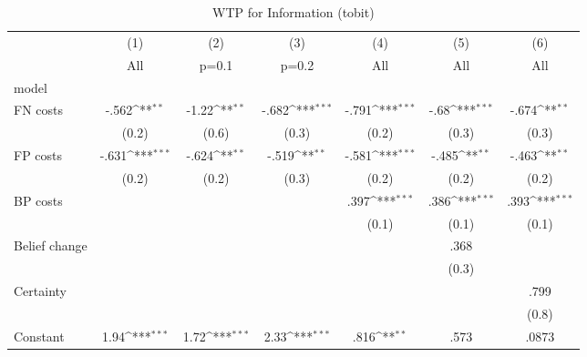 \begin{table}[htbp]\centering
\def\sym#1{\ifmmode^{#1}\else\(^{#1}\)\fi}
\caption{WTP for Information (tobit)}
\begin{tabular}{l*{6}{c}}
\hline\hline
                &\multicolumn{1}{c}{(1)}&\multicolumn{1}{c}{(2)}&\multicolumn{1}{c}{(3)}&\multicolumn{1}{c}{(4)}&\multicolumn{1}{c}{(5)}&\multicolumn{1}{c}{(6)}\\
                &\multicolumn{1}{c}{All}&\multicolumn{1}{c}{p=0.1}&\multicolumn{1}{c}{p=0.2}&\multicolumn{1}{c}{All}&\multicolumn{1}{c}{All}&\multicolumn{1}{c}{All}\\
\hline
model           &                  &                  &                  &                  &                  &                  \\
FN costs        &    -.562\sym{**} &    -1.22\sym{**} &    -.682\sym{***}&    -.791\sym{***}&     -.68\sym{***}&    -.674\sym{**} \\
                &    (0.2)         &    (0.6)         &    (0.3)         &    (0.2)         &    (0.3)         &    (0.3)         \\
FP costs        &    -.631\sym{***}&    -.624\sym{**} &    -.519\sym{**} &    -.581\sym{***}&    -.485\sym{**} &    -.463\sym{**} \\
                &    (0.2)         &    (0.2)         &    (0.3)         &    (0.2)         &    (0.2)         &    (0.2)         \\
BP costs        &                  &                  &                  &     .397\sym{***}&     .386\sym{***}&     .393\sym{***}\\
                &                  &                  &                  &    (0.1)         &    (0.1)         &    (0.1)         \\
Belief change   &                  &                  &                  &                  &     .368         &                  \\
                &                  &                  &                  &                  &    (0.3)         &                  \\
Certainty       &                  &                  &                  &                  &                  &     .799         \\
                &                  &                  &                  &                  &                  &    (0.8)         \\
Constant        &     1.94\sym{***}&     1.72\sym{***}&     2.33\sym{***}&     .816\sym{**} &     .573         &    .0873         \\

\end{tabular}
\end{table}
